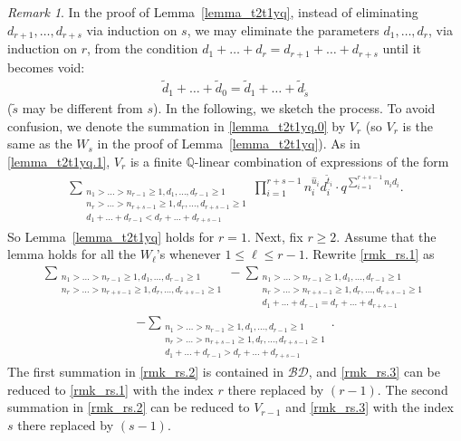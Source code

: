\documentclass[12pt, reqno]{amsart}
\theoremstyle{definition}
\theoremstyle{remark}
\newtheorem{remark}[theorem]{Remark}
\numberwithin{equation}{section}
\newcommand{\BD}{\mathcal {BD}}
\newcommand{\Q}{ \mathbb Q }
\newcommand{\w}{\tilde}
\numberwithin{equation}{section}
\begin{document}
\begin{remark}   \label{rmk_rs}
In the proof of Lemma~\ref{lemma_t2t1yq}, instead of eliminating 
$d_{r+1}, \ldots, d_{r+s}$ via induction on $s$, 
we may eliminate the parameters $d_{1}, \ldots, d_{r}$, 
via induction on $r$, from the condition 
$d_1+ \ldots + d_r = d_{r+1} + \ldots + d_{r+s}$ until it becomes void:
\begin{eqnarray}  \label{rmk_rs.100}
\w d_1+ \ldots + \w d_{0} = \w d_{1} + \ldots + \w d_{\w s}
\end{eqnarray}
($\w s$ may be different from $s$).
In the following, we sketch the process. To avoid confusion, 
we denote the summation in \eqref{lemma_t2t1yq.0} by $V_r$ (so $V_r$ is 
the same as the $W_s$ in the proof of Lemma~\ref{lemma_t2t1yq}).
As in \eqref{lemma_t2t1yq.1}, 
$V_r$ is a finite $\Q$-linear combination of expressions of the form
\begin{eqnarray}  \label{rmk_rs.1}
\sum_{\substack{n_1 > \ldots > n_{r-1} \ge 1, d_1, \ldots, d_{r-1} \ge 1\\
    n_{r} > \ldots > n_{r+s-1} \ge 1, d_{r}, \ldots, d_{r+s-1} \ge 1\\
    d_1+ \ldots + d_{r-1} < d_{r} + \ldots + d_{r+s-1}}}
   \prod_{i=1}^{r+s-1} n_i^{\hat u_i}d_i^{\w t_i}  
   \cdot q^{\sum_{i=1}^{r+s-1} n_i d_i}.
\end{eqnarray}
So Lemma~\ref{lemma_t2t1yq} holds for $r = 1$. Next, fix $r \ge 2$.
Assume that the lemma holds for all the $W_\ell$'s whenever 
$1 \le \ell \le r-1$. Rewrite \eqref{rmk_rs.1} as
\begin{eqnarray}  \label{rmk_rs.2}
\sum_{\substack{n_1 > \ldots > n_{r-1} \ge 1, d_1, \ldots, d_{r-1} \ge 1\\
    n_{r} > \ldots > n_{r+s-1} \ge 1, d_{r}, \ldots, d_{r+s-1} \ge 1}}
- \sum_{\substack{n_1 > \ldots > n_{r-1} \ge 1, d_1, \ldots, d_{r-1} \ge 1\\
    n_{r} > \ldots > n_{r+s-1} \ge 1, d_{r}, \ldots, d_{r+s-1} \ge 1\\
    d_1+ \ldots + d_{r-1} = d_{r} + \ldots + d_{r+s-1}}}
\end{eqnarray}
\begin{eqnarray}  \label{rmk_rs.3}
- \sum_{\substack{n_1 > \ldots > n_{r-1} \ge 1, d_1, \ldots, d_{r-1} \ge 1\\
    n_{r} > \ldots > n_{r+s-1} \ge 1, d_{r}, \ldots, d_{r+s-1} \ge 1\\
    d_1+ \ldots + d_{r-1} > d_{r} + \ldots + d_{r+s-1}}}.
\end{eqnarray}
The first summation in \eqref{rmk_rs.2} is contained in $\BD$, 
and \eqref{rmk_rs.3} can be reduced to \eqref{rmk_rs.1} with 
the index $r$ there replaced by $(r-1)$. 
The second summation in \eqref{rmk_rs.2} can be reduced to $V_{r-1}$ 
and \eqref{rmk_rs.3} with the index $s$ there replaced by $(s-1)$. 
\end{remark}
\end{document}

